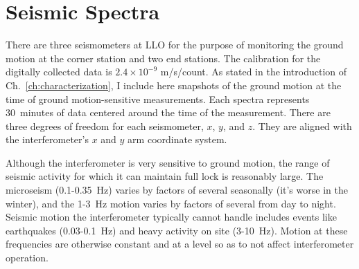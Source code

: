 



\section{Seismic Spectra}
\label{sec:groundmotion}
There are three seismometers at LLO for the purpose of monitoring the
ground motion at the corner station and two end stations. The
calibration for the digitally collected data is $2.4 \times 10^{-9}$
m/s/count. As stated in the introduction of
Ch.~\ref{ch:characterization}, I include here snapshots of the ground
motion at the time of ground motion-sensitive measurements. Each
spectra represents 30~minutes of data centered around the time of the
measurement. There are three degrees of freedom for each seismometer,
$x$, $y$, and $z$. They are aligned with the interferometer's $x$ and
$y$ arm coordinate system.

Although the interferometer is very sensitive to ground motion, the
range of seismic activity for which it can maintain full lock is
reasonably large. The microseism (0.1-0.35~Hz) varies by factors of
several seasonally (it's worse in the winter), and the 1-3~Hz motion
varies by factors of several from day to night. Seismic motion the
interferometer typically cannot handle includes events like
earthquakes (0.03-0.1~Hz) and heavy activity on site (3-10~Hz). Motion
at these frequencies are otherwise constant and at a level so as to
not affect interferometer operation. 

